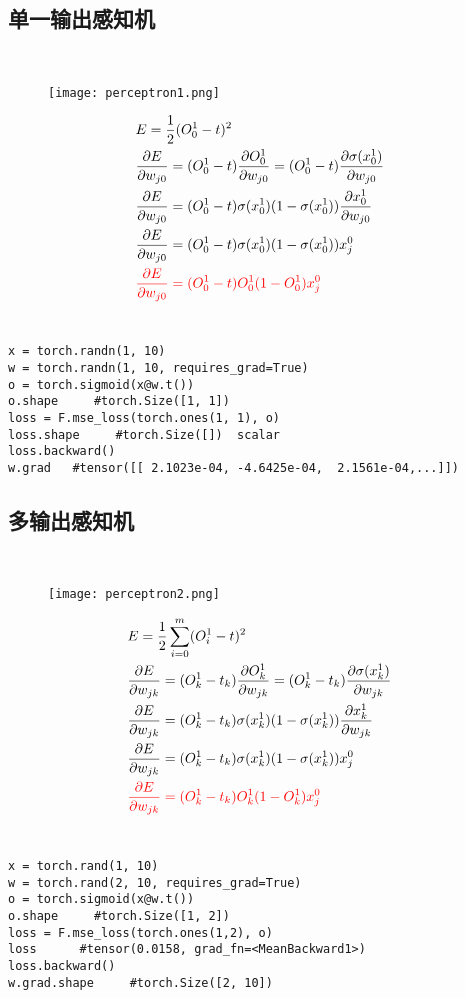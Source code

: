 \subsection{单一输出感知机}
~\\
\begin{figure}[!h]
  \centering
  \texttt{[image: perceptron1.png]}
\end{figure}

\begin{align*}
  &E = \frac{1}{2}(O^1_0-t)^2\\
  &\frac{\partial E}{\partial w_{j0}}= (O^1_0-t)\frac{\partial O^1_0}{\partial w_{j0}}=(O^1_0-t)\frac{\partial \sigma(x_0^1)}{\partial w_{j0}}\\
  &\frac{\partial E}{\partial w_{j0}}=(O^1_0-t)\sigma(x^1_0)(1-\sigma(x^1_0))\frac{\partial x^1_0}{\partial w_{j0}}\\
  &\frac{\partial E}{\partial w_{j0}}=(O^1_0-t)\sigma(x^1_0)(1-\sigma(x^1_0))x^0_j\\
  &\textcolor{red}{\frac{\partial E}{\partial w_{j0}}=(O^1_0-t)O^1_0(1-O^1_0)x^0_j}
\end{align*}
~\\
\begin{lstlisting}
x = torch.randn(1, 10)
w = torch.randn(1, 10, requires_grad=True)
o = torch.sigmoid(x@w.t())
o.shape     #torch.Size([1, 1])
loss = F.mse_loss(torch.ones(1, 1), o)
loss.shape     #torch.Size([])  scalar
loss.backward()
w.grad   #tensor([[ 2.1023e-04, -4.6425e-04,  2.1561e-04,...]])
\end{lstlisting}

\newpage
\subsection{多输出感知机}
~\\
\begin{figure}[!h]
  \centering
  \texttt{[image: perceptron2.png]}
\end{figure}

\begin{align*}
  &E = \frac{1}{2}\sum_{i=0}^{m}(O^1_i-t)^2\\
  &\frac{\partial E}{\partial w_{jk}}= (O^1_k-t_k)\frac{\partial O^1_k}{\partial w_{jk}}=(O^1_k-t_k)\frac{\partial \sigma(x_k^1)}{\partial w_{jk}}\\
  &\frac{\partial E}{\partial w_{jk}}=(O^1_k-t_k)\sigma(x^1_k)(1-\sigma(x^1_k))\frac{\partial x^1_k}{\partial w_{jk}}\\
  &\frac{\partial E}{\partial w_{jk}}=(O^1_k-t_k)\sigma(x^1_k)(1-\sigma(x^1_k))x^0_j\\
  &\textcolor{red}{\frac{\partial E}{\partial w_{jk}}=(O^1_k-t_k)O^1_k(1-O^1_k)x^0_j}
\end{align*}
~\\
\begin{lstlisting}
x = torch.rand(1, 10)
w = torch.rand(2, 10, requires_grad=True)
o = torch.sigmoid(x@w.t())
o.shape     #torch.Size([1, 2])
loss = F.mse_loss(torch.ones(1,2), o)
loss      #tensor(0.0158, grad_fn=<MeanBackward1>)
loss.backward()
w.grad.shape     #torch.Size([2, 10])
\end{lstlisting}




